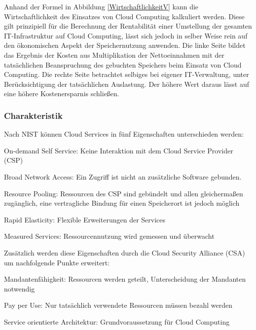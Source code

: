 \documentclass[13pt,a4paper,bibliography=totocnumbered,listof=totocnumbered]{scrartcl}
\begin{document}
Anhand der Formel in Abbildung \ref{WirtschaftlichkeitV} kann die Wirtschaftlichkeit des Einsatzes von Cloud Computing kalkuliert werden. Diese gilt prinzipiell für die Berechnung der Rentabilität einer Umstellung der gesamten IT-Infrastruktur auf Cloud Computing, lässt sich jedoch in selber Weise rein auf den ökonomischen Aspekt der Speichernutzung anwenden. Die linke Seite bildet das Ergebnis der Kosten aus Multiplikation der Nettoeinnahmen mit der tatsächlichen Beanspruchung des gebuchten Speichers beim Einsatz von Cloud Computing. Die rechte Seite betrachtet selbiges bei eigener IT-Verwaltung, unter Berücksichtigung der tatsächlichen Auslastung. Der höhere Wert daraus lässt auf eine höhere Kostenersparnis schließen.\\
\cite{33} \cite[S. 71ff.]{44}

\subsubsection{Charakteristik}
Nach NIST \cite[S. 2f.]{34} können Cloud Services in fünf Eigenschaften unterschieden werden:
\begin{compactitem}
	\item On-demand Self Service: Keine Interaktion mit dem Cloud Service Provider (CSP)
	\item Broad Network Access: Ein Zugriff ist nicht an zusätzliche Software gebunden.
	\item Resource Pooling: Ressourcen des CSP sind gebündelt und allen gleichermaßen zugänglich, eine vertragliche Bindung für einen Speicherort ist jedoch möglich
	\item Rapid Elasticity: Flexible Erweiterungen der Services
	\item Measured Services: Ressourcennutzung wird gemessen und überwacht
\end{compactitem}

Zusätzlich werden diese Eigenschaften durch die Cloud Security Alliance (CSA) \cite[S. 14ff.]{36} um nachfolgende Punkte erweitert:
\begin{compactitem}
	\item Mandantenfähigkeit: Ressourcen werden geteilt, Unterscheidung der Mandanten notwendig
	\item Pay per Use: Nur tatsächlich verwendete Ressourcen müssen bezahl werden
	\item Service orientierte Architektur: Grundvoraussetzung für Cloud Computing
\end{compactitem}
\end{document}
